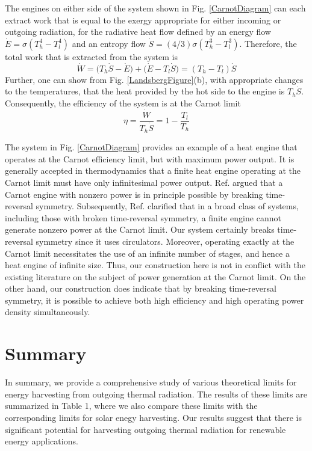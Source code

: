 \documentclass[notitlepage,onecolumn,aps,showpacs,preprintnumbers,amsmath,amssymb,superscriptaddress]{revtex4-1}
\begin{document}
The engines on either side of the system shown in Fig. \ref{CarnotDiagram} can each extract work that is equal to the exergy appropriate for either incoming or outgoing radiation, for the radiative heat flow defined by an energy flow $\dot{E} = \sigma (T_h^4-T_l^4)$ and an entropy flow $\dot{S} = (4/3)\sigma(T_h^3-T_l^3)$. Therefore, the total work that is extracted from the system is
\begin{equation}
\dot{W} = \big(T_h\dot{S} -\dot{E}\big) + \big(\dot{E}-T_l\dot{S}\big)  = (T_h - T_l)\dot{S}
\end{equation}
Further, one can show from Fig. \ref{LandsbergFigure}(b), with appropriate changes to the temperatures, that the heat provided by the hot side to the engine is $T_h \dot{S}$. Consequently, the efficiency of the system is at the Carnot limit
\begin{equation}
\eta = \frac{\dot{W}}{T_h\dot{S}}= 1 - \frac{T_l}{T_h}
\end{equation}

The system in Fig. \ref{CarnotDiagram} provides an example of a heat engine that operates at the Carnot efficiency limit, but with maximum power output. It is generally accepted in thermodynamics that a finite heat engine operating at the Carnot limit must have only infinitesimal power output. Ref. \citep{casati} argued that a Carnot engine with nonzero power is in principle possible by breaking time-reversal symmetry. Subsequently, Ref. \citep{shiraishi} clarified that in a broad class of systems, including those with broken time-reversal symmetry, a finite engine cannot generate nonzero power at the Carnot limit. Our system certainly breaks time-reversal symmetry since it uses circulators. Moreover, operating exactly at the Carnot limit necessitates the use of an infinite number of stages, and hence a heat engine of infinite size. Thus, our construction here is not in conflict with the existing literature on the subject of power generation at the Carnot limit. On the other hand, our construction does indicate that by breaking time-reversal symmetry, it is possible to achieve both high efficiency and high operating 	power density simultaneously. 

\section{Summary}
In summary, we provide a comprehensive study of various theoretical limits for energy harvesting from outgoing thermal radiation. The results of these limits are summarized in Table 1, where we also compare these limits with the corresponding limits for solar enegy harvesting. Our results suggest that there is significant potential for harvesting outgoing thermal radiation for renewable energy applications. \\
\end{document}
